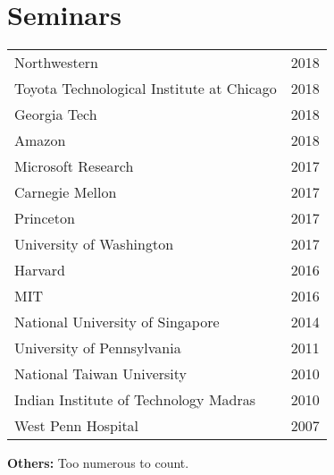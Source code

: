 
\section{Seminars}
\begin{center}
\begin{tabularx}{\linewidth}{Xr}
Northwestern & 2018\\
Toyota Technological Institute at Chicago & 2018\\
Georgia Tech & 2018\\
Amazon & 2018\\
Microsoft Research & 2017\\
Carnegie Mellon & 2017\\
Princeton & 2017\\
University of Washington & 2017\\
Harvard & 2016\\
MIT & 2016\\
National University of Singapore & 2014\\
University of Pennsylvania & 2011\\
National Taiwan University & 2010\\
Indian Institute of Technology Madras & 2010\\
West Penn Hospital & 2007
\end{tabularx}
\end{center}
\noindent \textbf{Others:} Too numerous to count.
